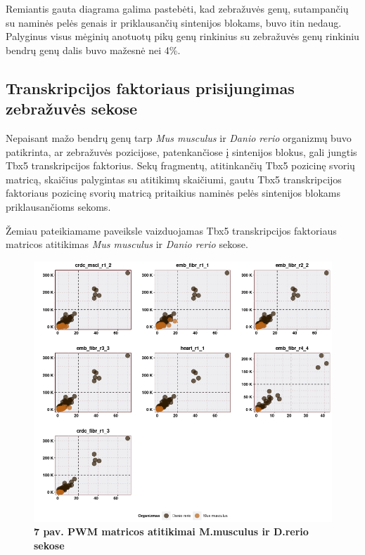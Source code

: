 \documentclass[12pt]{article}
\begin{document}
Remiantis gauta diagrama galima pastebėti, kad zebražuvės genų, sutampančių su
naminės pelės genais ir priklausančių sintenijos blokams, buvo itin nedaug.
Palyginus visus mėginių anotuotų pikų genų rinkinius su zebražuvės genų rinkiniu
bendrų genų dalis buvo mažesnė nei 4\%.

\subsection{Transkripcijos faktoriaus prisijungimas zebražuvės sekose}
Nepaisant mažo bendrų genų tarp \emph{Mus musculus} ir \emph{Danio rerio}
organizmų buvo patikrinta, ar zebražuvės pozicijose, patenkančiose į sintenijos
blokus, gali jungtis Tbx5 transkripcijos faktorius. Sekų fragmentų,
atitinkančių Tbx5 pozicinę svorių matricą, skaičius palygintas su atitikimų
skaičiumi, gautu Tbx5 transkripcijos faktoriaus pozicinę svorių matricą
pritaikius naminės pelės sintenijos blokams priklausančioms sekoms.

Žemiau pateikiamame paveiksle vaizduojamas Tbx5 transkripcijos faktoriaus
matricos atitikimas \emph{Mus musculus} ir \emph{Danio rerio} sekose.

\begin{figure}[htb]
    \begin{center}
        \includegraphics[width=1\linewidth]{../Figures/PWM_matches_all.png}
        \vspace{-2\baselineskip}
        \caption*{\small\textbf{7 pav. PWM matricos atitikimai M.musculus ir
        D.rerio sekose}}
        \label{fig:birds}
    \end{center}
\end{figure}
\end{document}
